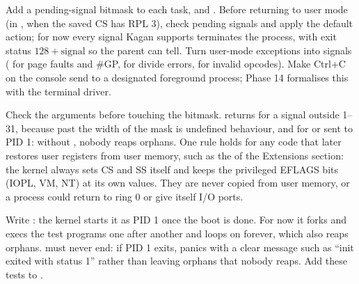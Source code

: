 \documentclass[11pt,a4paper]{article}
\begin{document}
Add a pending-signal bitmask to each task, and . Before returning to user mode (in
, when the saved CS has RPL 3), check pending signals and apply the default action; for now every
signal Kagan supports terminates the process, with exit status $128 + \text{signal}$ so the parent can tell. Turn
user-mode exceptions into signals ( for page faults and \#GP,  for divide errors,
 for invalid opcodes). Make Ctrl+C on the console send  to a designated foreground process;
Phase 14 formalises this with the terminal driver.

Check the arguments before touching the bitmask.  returns  for a signal outside 1--31,
because  past the width of the mask is undefined behaviour, and  for  or
 sent to PID 1: without , nobody reaps orphans. One rule holds for any code that later
restores user registers from user memory, such as the  of the Extensions section: the kernel always
sets CS and SS itself and keeps the privileged EFLAGS bits (IOPL, VM, NT) at its own values. They are never copied
from user memory, or a process could return to ring 0 or give itself I/O ports.

Write : the kernel starts it as PID 1 once the boot is done. For now it forks and execs the test
programs one after another and loops on  forever, which also reaps orphans.  must
never end: if PID 1 exits,  panics with a clear message such as ``init exited with status 1'' rather
than leaving orphans that nobody reaps. Add these tests to .
\end{document}
